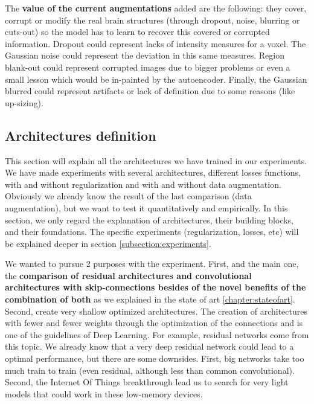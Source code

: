

The \textbf{value of the current augmentations} added are the following: they cover, corrupt or modify the real brain structures (through dropout, noise, blurring or cuts-out) so the model has to learn to recover this covered or corrupted information. Dropout could represent lacks of  intensity measures for a voxel. The Gaussian noise could represent the deviation in this same measures. Region blank-out could represent corrupted images due to bigger problems or even a small lesson which would be in-painted by the autoencoder. Finally, the Gaussian blurred could represent artifacts or lack of definition due to some reasons (like up-sizing).

\subsection{Architectures definition}

This section will explain all the architectures we have trained in our experiments. We have made experiments with several architectures, different losses functions, with and without regularization and with and without data augmentation. Obviously we already know the result of the last comparison (data augmentation), but we want to test it quantitatively and empirically. In this section, we only regard the explanation of architectures, their building blocks, and their foundations. The specific experiments (regularization, losses, etc) will be explained deeper in section \ref{subsection:experiments}.

We wanted to pursue 2 purposes with the experiment. First, and the main one, the \textbf{comparison of residual architectures and convolutional architectures with skip-connections besides of the novel benefits of the combination of both} as we explained in the state of art \ref{chapter:stateofart}. Second, create very shallow optimized architectures. The creation of architectures with fewer and fewer weights through the optimization of the connections and is one of the guidelines of Deep Learning. For example, residual networks come from this topic. We already know that a very deep residual network could lead to a optimal performance, but there are some downsides. First, big networks take too much train to train (even residual, although less than common convolutional). Second, the Internet Of Things breakthrough lead us to search for very light models that could work in these low-memory devices.

